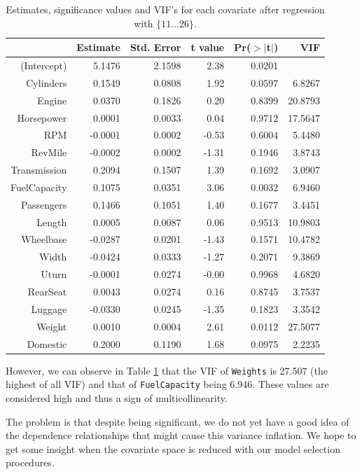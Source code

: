 \documentclass[12pt]{article}
\begin{document}
\begin{table}[h!]
\centering
\caption{Estimates, significance values and VIF's for each covariate after regression with $\{11\ldots26\}$.}
\label{tab:individual}

\begin{tabular}{|rrrrrr|}
  \hline
 & Estimate & Std. Error & t value & Pr($>$$|$t$|$) & VIF \\ 
  \hline
(Intercept) & 5.1476 & 2.1598 & 2.38 & 0.0201 & \\ 
  Cylinders & 0.1549 & 0.0808 & 1.92 & 0.0597 & 6.8267\\ 
  Engine & 0.0370 & 0.1826 & 0.20 & 0.8399 & 20.8793\\ 
  Horsepower & 0.0001 & 0.0033 & 0.04 & 0.9712 & 17.5647\\ 
  RPM & -0.0001 & 0.0002 & -0.53 & 0.6004 & 5.4480\\ 
  RevMile & -0.0002 & 0.0002 & -1.31 & 0.1946 & 3.8743\\ 
  Transmission & 0.2094 & 0.1507 & 1.39 & 0.1692 & 3.0907\\ 
  FuelCapacity & 0.1075 & 0.0351 & 3.06 & 0.0032 & 6.9460\\ 
  Passengers & 0.1466 & 0.1051 & 1.40 & 0.1677 & 3.4451\\ 
  Length & 0.0005 & 0.0087 & 0.06 & 0.9513 & 10.9803\\ 
  Wheelbase & -0.0287 & 0.0201 & -1.43 & 0.1571 & 10.4782\\ 
  Width & -0.0424 & 0.0333 & -1.27 & 0.2071 &  9.3869\\ 
  Uturn & -0.0001 & 0.0274 & -0.00 & 0.9968 & 4.6820\\ 
  RearSeat & 0.0043 & 0.0274 & 0.16 & 0.8745 & 3.7537\\ 
  Luggage & -0.0330 & 0.0245 & -1.35 & 0.1823 & 3.3542\\ 
  Weight & 0.0010 & 0.0004 & 2.61 & 0.0112 & 27.5077\\ 
  Domestic & 0.2000 & 0.1190 & 1.68 & 0.0975 & 2.2235\\ 
   \hline
\end{tabular}
\end{table}

However, we can observe in Table \ref{tab:individual} that the VIF of \texttt{Weights} is 27.507 (the highest of all VIF) and
that of \texttt{FuelCapacity} being  6.946. These values are considered high and thus
a sign of multicollinearity.

The problem is that despite being significant, we do not yet have a good idea of the dependence relationships that might cause this variance inflation.
We hope to get some insight when the covariate space is reduced with our model selection procedures.
\end{document}
